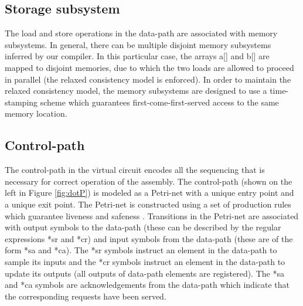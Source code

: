 \documentclass[conference]{IEEEtran}
\begin{document}
\subsection{Storage subsystem}

The load and store operations in the data-path
are associated with memory subsystems.  In general, there
can be multiple disjoint memory subsystems inferred by our
compiler.  In this particular case, the arrays a[] and b[] 
are mapped to disjoint memories, due to which the two
loads are allowed to proceed in parallel (the relaxed consistency
model is enforced).
In order to maintain the relaxed consistency model, the
memory subsystems are designed to use a time-stamping 
scheme which guarantees first-come-first-served access to
the same memory location.

\subsection{Control-path}


The control-path in the virtual circuit encodes
all the sequencing that is necessary for correct
operation of the assembly.
The control-path (shown on the left
in Figure \ref{fig:dotP}) is modeled as a Petri-net with
a unique entry point and a unique exit point.  The Petri-net
is constructed using a set of production rules which guarantee
liveness and safeness \cite{ahir}.  Transitions in the Petri-net
are associated with output symbols to the data-path (these can
be described by the regular expressions *sr and *cr)
and input symbols from the data-path (these are of the form *sa and
*ca).  The *sr symbols instruct an element in the data-path to
sample its inputs and the *cr symbols instruct an element in the
data-path to update its outputs (all outputs of data-path elements
are registered).  The *sa and *ca symbols are acknowledgements
from the data-path which indicate that the corresponding requests
have been served.  
\end{document}

